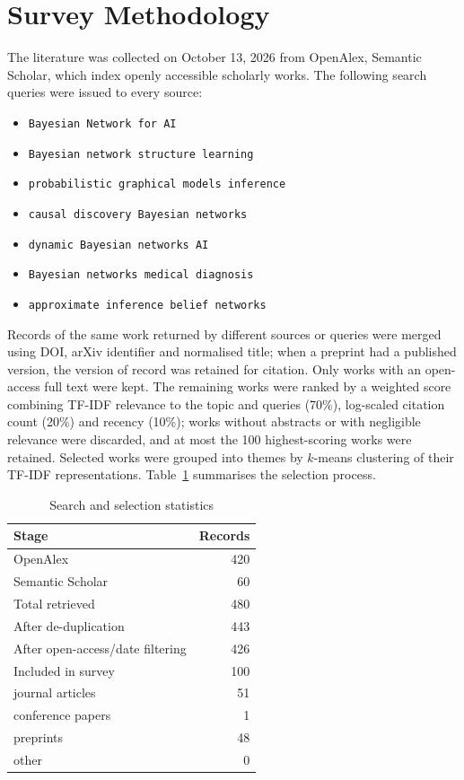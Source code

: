 \section{Survey Methodology}\label{sec:method}
The literature was collected on October 13, 2026 from OpenAlex, Semantic Scholar, which index openly accessible scholarly works. The following search queries were issued to every source:
\begin{itemize}
\item \texttt{Bayesian Network for AI}
\item \texttt{Bayesian network structure learning}
\item \texttt{probabilistic graphical models inference}
\item \texttt{causal discovery Bayesian networks}
\item \texttt{dynamic Bayesian networks AI}
\item \texttt{Bayesian networks medical diagnosis}
\item \texttt{approximate inference belief networks}
\end{itemize}

Records of the same work returned by different sources or queries were merged using DOI, arXiv identifier and normalised title; when a preprint had a published version, the version of record was retained for citation. Only works with an open-access full text were kept. The remaining works were ranked by a weighted score combining TF-IDF relevance to the topic and queries (70\%), log-scaled citation count (20\%) and recency (10\%); works without abstracts or with negligible relevance were discarded, and at most the 100 highest-scoring works were retained. Selected works were grouped into themes by $k$-means clustering of their TF-IDF representations. Table~\ref{tab:prisma} summarises the selection process.

\begin{table}[!t]
\centering
\caption{Search and selection statistics}\label{tab:prisma}
\begin{tabular}{@{}lr@{}}
\toprule
\textbf{Stage} & \textbf{Records} \\
\midrule
OpenAlex & 420 \\
Semantic Scholar & 60 \\
\midrule
Total retrieved & 480 \\
After de-duplication & 443 \\
After open-access/date filtering & 426 \\
Included in survey & 100 \\
\midrule
\quad journal articles & 51 \\
\quad conference papers & 1 \\
\quad preprints & 48 \\
\quad other & 0 \\
\bottomrule
\end{tabular}
\end{table}

